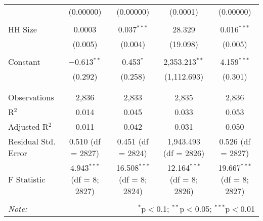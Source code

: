 \begin{table}[!htbp]
\begin{tabular}{@{\extracolsep{5pt}}lcccc}
  & (0.00000) & (0.00000) & (0.0001) & (0.00000) \\ 
  & & & & \\ 
 HH Size & 0.0003 & 0.037$^{***}$ & 28.329 & 0.016$^{***}$ \\ 
  & (0.005) & (0.004) & (19.098) & (0.005) \\ 
  & & & & \\ 
 Constant & $-$0.613$^{**}$ & 0.453$^{*}$ & 2,353.213$^{**}$ & 4.159$^{***}$ \\ 
  & (0.292) & (0.258) & (1,112.693) & (0.301) \\ 
  & & & & \\ 
\hline \\[-1.8ex] 
Observations & 2,836 & 2,833 & 2,835 & 2,836 \\ 
R$^{2}$ & 0.014 & 0.045 & 0.033 & 0.053 \\ 
Adjusted R$^{2}$ & 0.011 & 0.042 & 0.031 & 0.050 \\ 
Residual Std. Error & 0.510 (df = 2827) & 0.451 (df = 2824) & 1,943.493 (df = 2826) & 0.526 (df = 2827) \\ 
F Statistic & 4.943$^{***}$ (df = 8; 2827) & 16.508$^{***}$ (df = 8; 2824) & 12.164$^{***}$ (df = 8; 2826) & 19.667$^{***}$ (df = 8; 2827) \\ 
\hline 
\hline \\[-1.8ex] 
\textit{Note:}  & \multicolumn{4}{r}{$^{*}$p$<$0.1; $^{**}$p$<$0.05; $^{***}$p$<$0.01} \\ 
\end{tabular} 
\end{table} 
